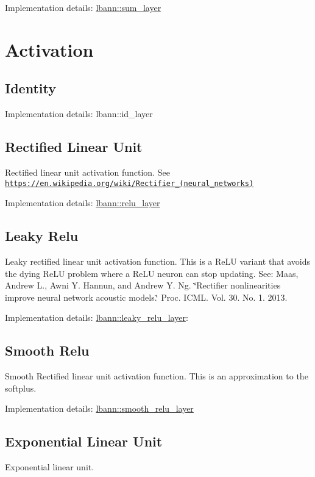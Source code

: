 Implementation details\+: \hyperlink{classlbann_1_1sum__layer}{lbann\+::sum\+\_\+layer}\hypertarget{layers_activation}{}\section{Activation}\label{layers_activation}
\hypertarget{layers_idlayer}{}\subsection{Identity}\label{layers_idlayer}
Implementation details\+: lbann\+::id\+\_\+layer\hypertarget{layers_reluLayer}{}\subsection{Rectified Linear Unit}\label{layers_reluLayer}
Rectified linear unit activation function. See \href{https://en.wikipedia.org/wiki/Rectifier_(neural_networks)}{\tt https\+://en.\+wikipedia.\+org/wiki/\+Rectifier\+\_\+(neural\+\_\+networks)}

Implementation details\+: \hyperlink{classlbann_1_1relu__layer}{lbann\+::relu\+\_\+layer}\hypertarget{layers_leakyrelu}{}\subsection{Leaky Relu}\label{layers_leakyrelu}
Leaky rectified linear unit activation function. This is a Re\+LU variant that avoids the dying Re\+LU problem where a Re\+LU neuron can stop updating. See\+: Maas, Andrew L., Awni Y. Hannun, and Andrew Y. Ng. \char`\"{}\+Rectifier
nonlinearities improve neural network acoustic models.\char`\"{} Proc. I\+C\+ML. Vol. 30. No. 1. 2013.

Implementation details\+: \hyperlink{classlbann_1_1leaky__relu__layer}{lbann\+::leaky\+\_\+relu\+\_\+layer}\+:\hypertarget{layers_smoothrelu}{}\subsection{Smooth Relu}\label{layers_smoothrelu}
Smooth Rectified linear unit activation function. This is an approximation to the softplus.

Implementation details\+: \hyperlink{classlbann_1_1smooth__relu__layer}{lbann\+::smooth\+\_\+relu\+\_\+layer}\hypertarget{layers_expLinUn}{}\subsection{Exponential Linear Unit}\label{layers_expLinUn}
Exponential linear unit.

